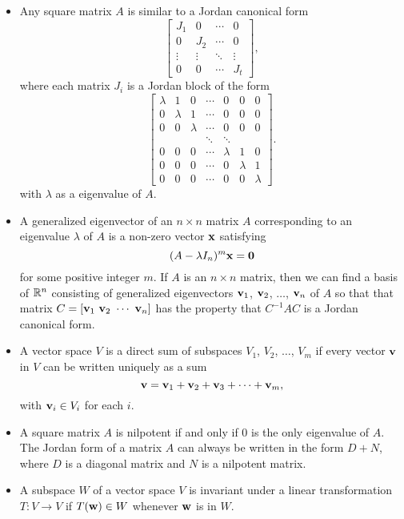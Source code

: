 \begin{itemize}

\item Any square matrix $A$ is similar to a Jordan canonical form 
\begin{equation*} 
\left[ \begin{array}{cccc} J_1&0&\cdots&0 \\ 0&J_2&\cdots&0 \\ \vdots&\vdots&\ddots&\vdots \\ 0&0&\cdots&J_t \end{array} \right],
\end{equation*}
where each matrix $J_i$ is a Jordan block of the form
\begin{equation*} 
\left[ \begin{array}{ccccccc} \lambda&1&0 &\cdots&0&0&0 \\ 0&\lambda&1&\cdots&0&0&0 \\ 0&0&\lambda&\cdots&0&0&0 \\ &&&\ddots&\ddots&& \\ 0&0&0&\cdots&\lambda&1&0 \\ 0&0&0&\cdots&0&\lambda&1 \\  0&0&0&\cdots&0&0&\lambda \end{array} \right].
\end{equation*}
with $\lambda$ as a eigenvalue of $A$.
\item A generalized eigenvector of an $n \times n$ matrix $A$ corresponding to an eigenvalue $\lambda$ of $A$ is a non-zero vector $\mathbf{x}$ satisfying 
\[(A - \lambda I_n)^m \mathbf{x} = \mathbf{0}\]
for some positive integer $m$. If $A$ is an $n \times n$ matrix, then we can find a basis of $\mathbb{R}^n$ consisting of generalized eigenvectors $\mathbf{v}_1$, $\mathbf{v}_2$, $\ldots$, $\mathbf{v}_n$ of $A$ so that that matrix $C = [\vv_1 \ \vv_2 \ \cdots \ \vv_n]$ has the property that $C^{-1}AC$ is a Jordan canonical form. 
\item A vector space $V$ is a direct sum of subspaces $V_1$, $V_2$, $\ldots$, $V_m$ if every vector $\mathbf{v}$ in $V$ can be written uniquely as a sum
\[\mathbf{v} = \mathbf{v}_1+\mathbf{v}_2+\mathbf{v}_3+\cdots + \mathbf{v}_m,\]
with $\mathbf{v}_i \in V_i$ for each $i$.
\item A square matrix $A$ is nilpotent if and only if $0$ is the only eigenvalue of $A$. The Jordan form of a matrix $A$ can always be written in the form $D + N$, where $D$ is a diagonal matrix and $N$ is a nilpotent matrix. 
\item A subspace $W$ of a vector space $V$ is invariant under a linear transformation $T: V \to V$ if $T(\mathbf{w}) \in W$ whenever $\mathbf{w}$ is in $W$.
\end{itemize}


